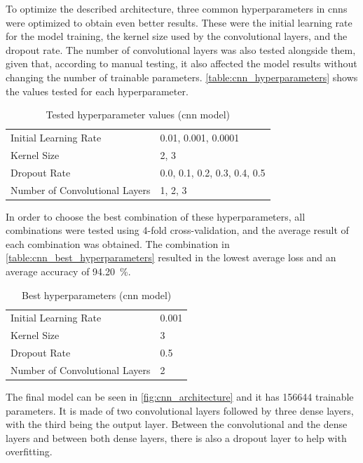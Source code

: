 To optimize the described architecture, three common hyperparameters in \acs{cnn}s were optimized to obtain even better results. These were the initial learning rate for the model training, the kernel size used by the convolutional layers, and the dropout rate. The number of convolutional layers was also tested alongside them, given that, according to manual testing, it also affected the model results without changing the number of trainable parameters. \autoref{table:cnn_hyperparameters} shows the values tested for each hyperparameter.

\begin{table}[ht]
    \centering
    \caption{Tested hyperparameter values (\acs{cnn} model)}
    \label{table:cnn_hyperparameters}
    \begin{tabular}{ll}
        \toprule
        Initial Learning Rate & 0.01, 0.001, 0.0001 \\
        Kernel Size & 2, 3 \\
        Dropout Rate & 0.0, 0.1, 0.2, 0.3, 0.4, 0.5 \\
        Number of Convolutional Layers & 1, 2, 3 \\
        \bottomrule
    \end{tabular}
\end{table}

In order to choose the best combination of these hyperparameters, all combinations were tested using 4-fold cross-validation, and the average result of each combination was obtained. The combination in \autoref{table:cnn_best_hyperparameters} resulted in the lowest average loss and an average accuracy of \SI{94.20}{\percent}.

\begin{table}[ht]
    \centering
    \caption{Best hyperparameters (\acs{cnn} model)}
    \label{table:cnn_best_hyperparameters}
    \begin{tabular}{ll}
        \toprule
        Initial Learning Rate & 0.001 \\
        Kernel Size & 3 \\
        Dropout Rate & 0.5 \\
        Number of Convolutional Layers & 2 \\
        \bottomrule
    \end{tabular}
\end{table}

The final model can be seen in \autoref{fig:cnn_architecture} and it has \num{156644} trainable parameters. It is made of two convolutional layers followed by three dense layers, with the third being the output layer. Between the convolutional and the dense layers and between both dense layers, there is also a dropout layer to help with overfitting.

